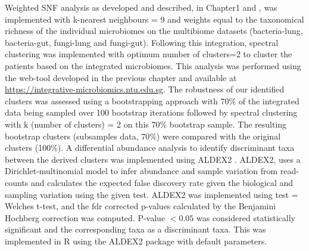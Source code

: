 Weighted SNF analysis as developed and described, in Chapter1 and \cite{Narayana2019}, was implemented with k-nearest neighbours = 9 and weights equal to the taxonomical richness of the individual microbiomes on the multibiome datasets (bacteria-lung, bacteria-gut, fungi-lung and fungi-gut). Following this integration, spectral clustering was implemented with optimum number of clusters=2 to cluster the patients based on the integrated microbiomes. This analysis was performed using the web-tool developed in the previous chapter and available at \url{https://integrative-microbiomics.ntu.edu.sg}. The robustness of our identified clusters was assessed using a bootstrapping approach with 70\% of the integrated data being sampled over 100 bootstrap iterations followed by spectral clustering with k (number of clusters) = 2 on this 70\% bootstrap sample. The resulting bootstrap clusters (subsamples data, 70\%) were compared with the original clusters (100\%). A differential abundance analysis to identify discriminant taxa between the derived clusters was implemented using ALDEX2 \cite{Fernandes2014}. ALDEX2, uses a Dirichlet-multinomial model to infer abundance and sample variation from read-counts and calculates the expected false discovery rate given the biological and sampling variation using the given test. ALDEX2 was implemented using test =  Welches t-test, and the fdr corrected p-values calculated by the Benjamini Hochberg correction was computed. P-value $< 0.05$ was considered statistically significant and the corresponding taxa as a discriminant taxa. This was implemented in R using the ALDEX2 package with default parameters.
